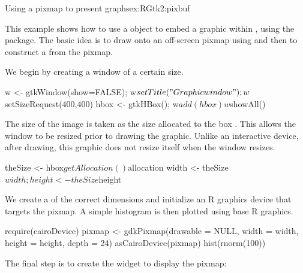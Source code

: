 \begin{example}{Using a pixmap to present graphs}{ex:RGtk2:pixbuf}

  This example shows how to use a  object to
  embed a graphic within , using the
   package. The basic idea is to draw onto an
  off-screen pixmap using  and
  then to construct a  from the pixmap. 

  We begin by creating a window of a certain size.
\begin{Schunk}
\begin{Sinput}
 w <- gtkWindow(show=FALSE); w$setTitle("Graphic window");
 w$setSizeRequest(400,400)
 hbox <- gtkHBox(); w$add(hbox)
 w$showAll()
\end{Sinput}
\end{Schunk}


The size of the image is taken as the size allocated to the box
. This allows the window to be resized prior to drawing the
graphic. Unlike an interactive device, after drawing, this graphic
does not resize itself when the window resizes.
\begin{Schunk}
\begin{Sinput}
 theSize <- hbox$getAllocation()$allocation
 width <- theSize$width; height <- theSize$height
\end{Sinput}
\end{Schunk}

We create a  of the correct dimensions and
initialize an R graphics device that targets the pixmap. A simple
histogram is then plotted using base R graphics.
\begin{Schunk}
\begin{Sinput}
 require(cairoDevice)
 pixmap <- gdkPixmap(drawable = NULL, 
                     width = width, height = height, depth = 24)
 asCairoDevice(pixmap)
 hist(rnorm(100))
\end{Sinput}
\end{Schunk}

The final step is to create the  widget to display the
pixmap: 
\begin{Schunk}
\end{Schunk}

\end{example}


